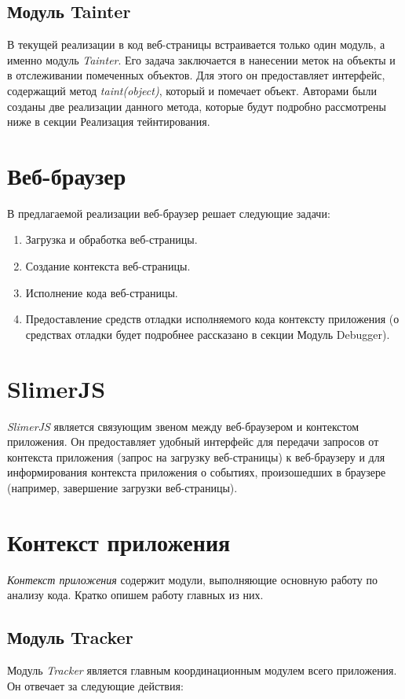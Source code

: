 \subsection{Модуль Tainter}
	В текущей реализации в код веб-страницы встраивается только один модуль, а именно модуль \textit{Tainter}. Его задача заключается в нанесении меток на объекты и в отслеживании помеченных объектов. Для этого он предоставляет интерфейс, содержащий метод \textit{taint(object)}, который и помечает объект. Авторами были созданы две реализации данного метода, которые будут подробно рассмотрены ниже в секции Реализация тейнтирования.

\section{Веб-браузер}
В предлагаемой реализации веб-браузер решает следующие задачи:

\begin{enumerate}
	\item Загрузка и обработка веб-страницы.
	\item Создание контекста веб-страницы.
	\item Исполнение кода веб-страницы.
	\item Предоставление средств отладки исполняемого кода контексту приложения (о средствах отладки будет подробнее рассказано в секции Модуль Debugger).
\end{enumerate}

\section{SlimerJS}
\textit{SlimerJS} является связующим звеном между веб-браузером и контекстом приложения. Он предоставляет удобный интерфейс для передачи запросов от контекста приложения (запрос на загрузку веб-страницы) к веб-браузеру и для информирования контекста приложения о событиях, произошедших в браузере (например, завершение загрузки веб-страницы).

\section{Контекст приложения}

\textit{Контекст приложения} содержит модули, выполняющие основную работу по анализу кода. Кратко опишем работу главных из них.

\subsection{Модуль Tracker}
	Модуль \textit{Tracker} является главным координационным модулем всего приложения. Он отвечает за следующие действия:


